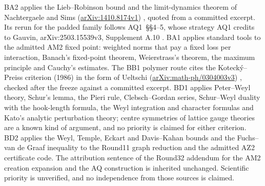 \documentclass[11pt,a4paper]{article}
\begin{document}
BA2 applies the Lieb--Robinson bound and the limit-dynamics theorem of
Nachtergaele and Sims
(\href{https://arxiv.org/abs/1410.8174v1}{arXiv:1410.8174v1}) \cite{ns}, quoted
from a committed excerpt. Its rerun for the padded family follows AQ1~\S\S4--5, whose
strategy AQ1 credits to Gauvin, arXiv:2503.15539v3, Supplement A.10
\cite{gauvin}. BA1
applies standard tools to the admitted AM2 fixed point: weighted norms that
pay a fixed loss per interaction, Banach's fixed-point theorem, Weierstrass's
theorem, the maximum principle and Cauchy's estimates. The BB1 polymer
route cites the Kotecký--Preiss criterion (1986) \cite{kp} in the form of
Ueltschi (\href{https://arxiv.org/abs/math-ph/0304003v3}{arXiv:math-ph/0304003v3})
\cite{ueltschi},
checked after the freeze against a committed excerpt. BD1 applies
Peter--Weyl theory, Schur's lemma, the Pieri rule, Clebsch--Gordan series,
Schur--Weyl duality with the hook-length formula, the Weyl integration and
character formulas and Kato's analytic perturbation theory; centre symmetries
of lattice gauge theories are a known kind of argument, and no priority is
claimed for either criterion. BD2 applies the Weyl, Temple, Eckart and
Davis--Kahan bounds and the Fuchs--van de Graaf inequality to the Round11
graph reduction and the admitted AZ2 certificate code. The attribution
sentence of the Round32 addendum \cite{r32add} for the AM2 creation expansion
and the AQ construction is inherited unchanged. Scientific priority is unverified, and
no independence from those sources is claimed.








\appendix


\end{document}
